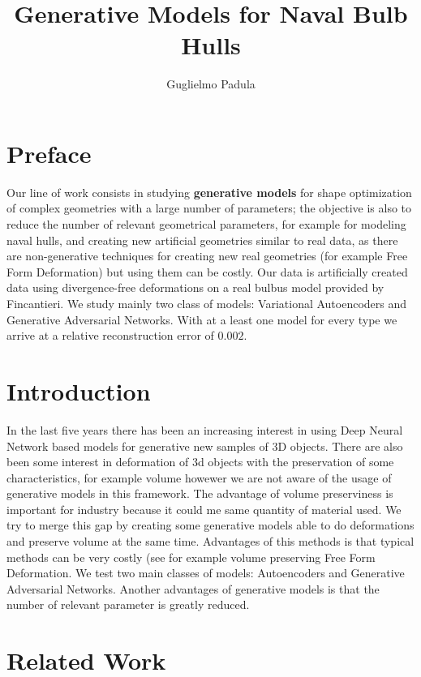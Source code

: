 \documentclass{article}
\title{Generative Models for Naval Bulb Hulls}
\author{Guglielmo Padula}
\begin{document}
\maketitle

\section{Preface}
Our line of work consists in studying \textbf{generative models} for shape optimization of complex geometries with a large number of parameters; the objective is also to reduce the number of relevant geometrical parameters, for example for modeling naval hulls, and creating new artificial geometries similar to real data, as there are non-generative techniques for creating new real geometries (for example Free Form Deformation) but using them can be costly. Our data is artificially created data using divergence-free deformations on a real bulbus model provided by Fincantieri. We study mainly two class of models: Variational Autoencoders and Generative Adversarial Networks. With at a least one model for every type we arrive at a relative reconstruction error of $0.002$.

\section{Introduction}
In the last five years there has been an increasing interest in using Deep Neural Network based models for generative new samples of 3D objects. There are also been some interest in deformation of 3d objects with the preservation of some characteristics, for example volume howewer we are not aware of the usage of generative models in this framework. The advantage of volume preserviness is important for industry because it could me same quantity of material used. 
We try to merge this gap by creating some generative models able to do deformations and preserve volume at the same time. Advantages of this methods is that typical methods can be very costly (see for example volume preserving Free Form Deformation. We test two main classes of models: Autoencoders and Generative Adversarial Networks. Another advantages of generative models is that the number of relevant parameter is greatly reduced.

\section{Related Work}
\end{document}
